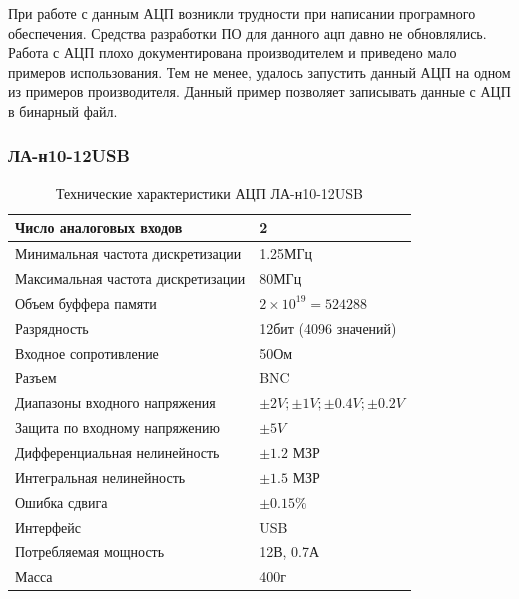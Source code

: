 \documentclass[../paper.tex]{subfiles}
\begin{document}
При работе с данным АЦП возникли трудности при написании програмного обеспечения. Средства разработки ПО для данного ацп давно не обновлялись. Работа с АЦП плохо документирована производителем и приведено мало примеров использования. Тем не менее, удалось запустить данный АЦП на одном из примеров производителя. Данный пример позволяет записывать данные с АЦП в бинарный файл.

\subsubsection{ЛА-н10-12USB}

\begin{table}[H]
\centering
\label{my-label}
\begin{tabular}{|l|l|}
                                                                      \hline
Число аналоговых входов            & 2                             \\ \hline
Минимальная частота дискретизации  & 1.25МГц                       \\ \hline
Максимальная частота дискретизации & 80МГц                         \\ \hline
Объем буффера памяти               & $2\times10^{19}=524288$       \\ \hline
Разрядность                        & 12бит (4096 значений)         \\ \hline
Входное сопротивление              & 50Ом                          \\ \hline
Разъем                             & BNC                           \\ \hline
Диапазоны входного напряжения      & $\pm2V;\pm1V;\pm0.4V;\pm0.2V$ \\ \hline
Защита по входному напряжению      & $\pm5V$                       \\ \hline
Дифференциальная нелинейность      & $\pm1.2$ МЗР                  \\ \hline
Интегральная нелинейность          & $\pm1.5$ МЗР                  \\ \hline
Ошибка сдвига                      & $\pm0.15\%$                   \\ \hline
Интерфейс                          & USB                           \\ \hline
Потребляемая мощность              & 12В, 0.7А                     \\ \hline
Масса                              & 400г                          \\ \hline
\end{tabular}
\caption{Технические характеристики АЦП ЛА-н10-12USB}
\end{table}
\end{document}
